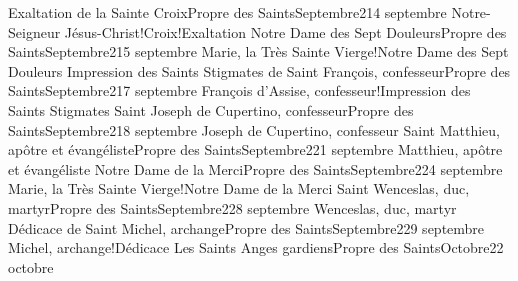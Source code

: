 \documentclass[twoside, french]{book}
\begin{document}
        {Exaltation de la Sainte Croix}{Propre des Saints}{Septembre}{2}{14 septembre}
        {}{}{Notre-Seigneur Jésus-Christ!Croix!Exaltation}{}{}
        {Notre Dame des Sept Douleurs}{Propre des Saints}{Septembre}{2}{15 septembre}
        {}{}{Marie, la Très Sainte Vierge!Notre Dame des Sept Douleurs}{}{}
        {Impression des Saints Stigmates de Saint François, confesseur}{Propre des Saints}{Septembre}{2}{17 septembre}
        {}{}{François d’Assise, confesseur!Impression des Saints Stigmates}{}{}
        {Saint Joseph de Cupertino, confesseur}{Propre des Saints}{Septembre}{2}{18 septembre}
        {}{}{Joseph de Cupertino, confesseur}{}{}
        {Saint Matthieu, apôtre et évangéliste}{Propre des Saints}{Septembre}{2}{21 septembre}
        {}{}{Matthieu, apôtre et évangéliste}{}{}
        {Notre Dame de la Merci}{Propre des Saints}{Septembre}{2}{24 septembre}
        {}{}{Marie, la Très Sainte Vierge!Notre Dame de la Merci}{}{}
        {Saint Wenceslas, duc, martyr}{Propre des Saints}{Septembre}{2}{28 septembre}
        {}{}{Wenceslas, duc, martyr}{}{}
        {Dédicace de Saint Michel, archange}{Propre des Saints}{Septembre}{2}{29 septembre}
        {}{}{Michel, archange!Dédicace}{}{}
        {Les Saints Anges gardiens}{Propre des Saints}{Octobre}{2}{2 octobre}
\end{document}

